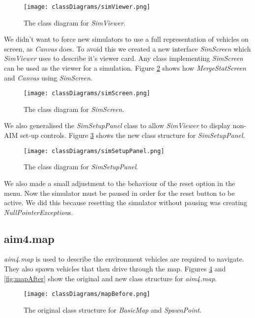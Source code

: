 \begin{appendices}
\begin{figure}[htb]
\texttt{[image: classDiagrams/simViewer.png]}
\caption{The class diagram for \emph{SimViewer}.}
\label{fig:simViewer}
\end{figure}

We didn't want to force new simulators to use a full representation of vehicles on screen, as \emph{Canvas} does. To avoid this we created a new interface \emph{SimScreen} which \emph{SimViewer} uses to describe it's viewer card. Any class implementing \emph{SimScreen} can be used as the viewer for a simulation. Figure \ref{fig:simScreen} shows how \emph{MergeStatScreen} and \emph{Canvas} using \emph{SimScreen}.

\begin{figure}[htb]
\texttt{[image: classDiagrams/simScreen.png]}
\caption{The class diagram for \emph{SimScreen}.}
\label{fig:simScreen}
\end{figure}

We also generalised the \emph{SimSetupPanel} class to allow \emph{SimViewer} to display non-AIM set-up controls. Figure \ref{fig:simSetupPanel} shows the new class structure for \emph{SimSetupPanel}.

\begin{figure}[htb]
\texttt{[image: classDiagrams/simSetupPanel.png]}
\caption{The class diagram for \emph{SimSetupPanel}.}
\label{fig:simSetupPanel}
\end{figure}

We also made a small adjustment to the behaviour of the reset option in the menu. Now the simulator must be paused in order for the reset button to be active. We did this because resetting the simulator without pausing was creating \emph{NullPointerException}s.

\subsection{aim4.map}
\label{subsec:aim4.map}
\emph{aim4.map} is used to describe the environment vehicles are required to navigate. They also spawn vehicles that then drive through the map. Figures \ref{fig:mapBefore} and \ref{fig:mapAfter} show the original and new class structure for \emph{aim4.map}.

\begin{figure}[htb]
\texttt{[image: classDiagrams/mapBefore.png]}
\caption{The original class structure for \emph{BasicMap} and \emph{SpawnPoint}.}
\label{fig:mapBefore}
\end{figure}


\end{appendices}
